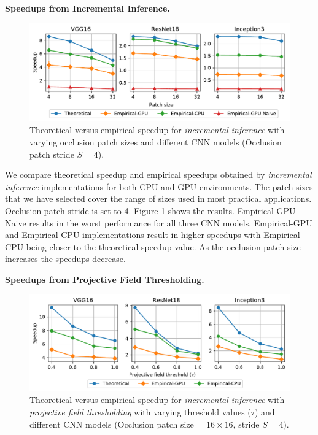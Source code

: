 \vspace{2mm}
\noindent \textbf{Speedups from Incremental Inference.}
\begin{figure}[t]
\includegraphics[width=\columnwidth]{images/5_2_1_edited}
\caption{Theoretical versus empirical speedup for \textit{incremental inference} with varying occlusion patch sizes and different CNN models (Occlusion patch stride $S=4$).}
\label{fig:5_2_1_edited}
\end{figure}

We compare theoretical speedup and empirical speedups obtained by \textit{incremental inference} implementations for both CPU and GPU environments.
The patch sizes that we have selected cover the range of sizes used in most practical applications.
Occlusion patch stride is set to 4.
Figure \ref{fig:5_2_1_edited} shows the results.
Empirical-GPU Naive results in the worst performance for all three CNN models.
Empirical-GPU and Empirical-CPU implementations result in higher speedups with Empirical-CPU being closer to the theoretical speedup value.
As the occlusion patch size increases the speedups decrease.

\vspace{2mm}
\noindent \textbf{Speedups from Projective Field Thresholding.}
\begin{figure}[t]
\includegraphics[width=\columnwidth]{images/5_2_2_edited}
\caption{Theoretical versus empirical speedup for \textit{incremental inference} with \textit{projective field thresholding} with varying threshold values ($\tau$) and different CNN models (Occlusion patch size = $16 \times 16$, stride $S=4$).}
\label{fig:5_2_2_edited}
\end{figure}

